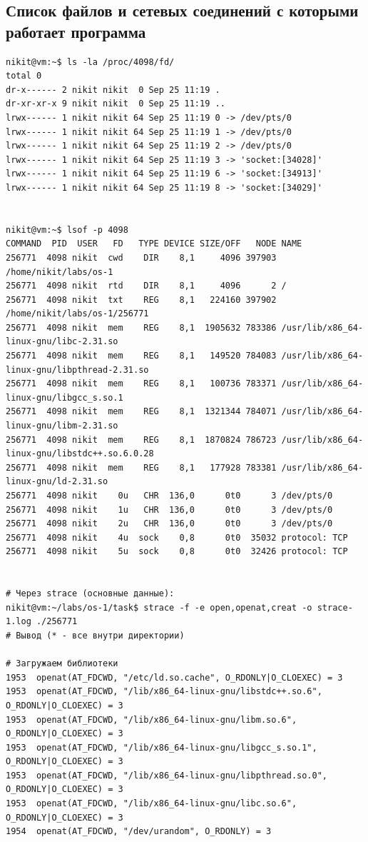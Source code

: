 \documentclass[11pt, a4paper]{article}
\begin{document}
\subsection{Список файлов и сетевых соединений с которыми работает программа}
\begin{Verbatim}[fontsize=\small,breaklines=true]
nikit@vm:~$ ls -la /proc/4098/fd/
total 0
dr-x------ 2 nikit nikit  0 Sep 25 11:19 .
dr-xr-xr-x 9 nikit nikit  0 Sep 25 11:19 ..
lrwx------ 1 nikit nikit 64 Sep 25 11:19 0 -> /dev/pts/0
lrwx------ 1 nikit nikit 64 Sep 25 11:19 1 -> /dev/pts/0
lrwx------ 1 nikit nikit 64 Sep 25 11:19 2 -> /dev/pts/0
lrwx------ 1 nikit nikit 64 Sep 25 11:19 3 -> 'socket:[34028]'
lrwx------ 1 nikit nikit 64 Sep 25 11:19 6 -> 'socket:[34913]'
lrwx------ 1 nikit nikit 64 Sep 25 11:19 8 -> 'socket:[34029]'


nikit@vm:~$ lsof -p 4098
COMMAND  PID  USER   FD   TYPE DEVICE SIZE/OFF   NODE NAME
256771  4098 nikit  cwd    DIR    8,1     4096 397903 /home/nikit/labs/os-1
256771  4098 nikit  rtd    DIR    8,1     4096      2 /
256771  4098 nikit  txt    REG    8,1   224160 397902 /home/nikit/labs/os-1/256771
256771  4098 nikit  mem    REG    8,1  1905632 783386 /usr/lib/x86_64-linux-gnu/libc-2.31.so
256771  4098 nikit  mem    REG    8,1   149520 784083 /usr/lib/x86_64-linux-gnu/libpthread-2.31.so
256771  4098 nikit  mem    REG    8,1   100736 783371 /usr/lib/x86_64-linux-gnu/libgcc_s.so.1
256771  4098 nikit  mem    REG    8,1  1321344 784071 /usr/lib/x86_64-linux-gnu/libm-2.31.so
256771  4098 nikit  mem    REG    8,1  1870824 786723 /usr/lib/x86_64-linux-gnu/libstdc++.so.6.0.28
256771  4098 nikit  mem    REG    8,1   177928 783381 /usr/lib/x86_64-linux-gnu/ld-2.31.so
256771  4098 nikit    0u   CHR  136,0      0t0      3 /dev/pts/0
256771  4098 nikit    1u   CHR  136,0      0t0      3 /dev/pts/0
256771  4098 nikit    2u   CHR  136,0      0t0      3 /dev/pts/0
256771  4098 nikit    4u  sock    0,8      0t0  35032 protocol: TCP
256771  4098 nikit    5u  sock    0,8      0t0  32426 protocol: TCP


# Через strace (основные данные):
nikit@vm:~/labs/os-1/task$ strace -f -e open,openat,creat -o strace-1.log ./256771
# Вывод (* - все внутри директории)

# Загружаем библиотеки
1953  openat(AT_FDCWD, "/etc/ld.so.cache", O_RDONLY|O_CLOEXEC) = 3
1953  openat(AT_FDCWD, "/lib/x86_64-linux-gnu/libstdc++.so.6", O_RDONLY|O_CLOEXEC) = 3
1953  openat(AT_FDCWD, "/lib/x86_64-linux-gnu/libm.so.6", O_RDONLY|O_CLOEXEC) = 3
1953  openat(AT_FDCWD, "/lib/x86_64-linux-gnu/libgcc_s.so.1", O_RDONLY|O_CLOEXEC) = 3
1953  openat(AT_FDCWD, "/lib/x86_64-linux-gnu/libpthread.so.0", O_RDONLY|O_CLOEXEC) = 3
1953  openat(AT_FDCWD, "/lib/x86_64-linux-gnu/libc.so.6", O_RDONLY|O_CLOEXEC) = 3
1954  openat(AT_FDCWD, "/dev/urandom", O_RDONLY) = 3


\end{Verbatim}
\end{document}
